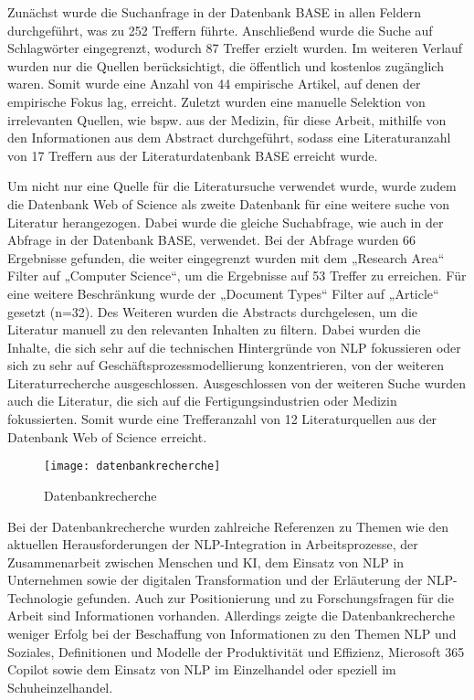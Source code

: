 Zunächst wurde die Suchanfrage in der Datenbank BASE in allen Feldern durchgeführt, was zu 252 Treffern führte. Anschließend wurde die Suche auf Schlagwörter eingegrenzt, wodurch 87 Treffer erzielt wurden. Im weiteren Verlauf wurden nur die Quellen berücksichtigt, die öffentlich und kostenlos zugänglich waren. Somit wurde eine Anzahl von 44 empirische Artikel, auf denen der empirische Fokus lag, erreicht. Zuletzt wurden eine manuelle Selektion von irrelevanten Quellen, wie bspw. aus der Medizin, für diese Arbeit, mithilfe von den Informationen aus dem Abstract durchgeführt, sodass eine Literaturanzahl von 17 Treffern aus der Literaturdatenbank BASE erreicht wurde.

Um nicht nur eine Quelle für die Literatursuche verwendet wurde, wurde zudem die Datenbank Web of Science als zweite Datenbank für eine weitere suche von Literatur herangezogen. Dabei wurde die gleiche Suchabfrage, wie auch in der Abfrage in der Datenbank BASE, verwendet. Bei der Abfrage wurden 66 Ergebnisse gefunden, die weiter eingegrenzt wurden mit dem „Research Area“ Filter auf „Computer Science“, um die Ergebnisse auf 53 Treffer zu erreichen. Für eine weitere Beschränkung wurde der „Document Types“ Filter auf „Article“ gesetzt (n=32). Des Weiteren wurden die Abstracts durchgelesen, um die Literatur manuell zu den relevanten Inhalten zu filtern. Dabei wurden die Inhalte, die sich sehr auf die technischen Hintergründe von NLP fokussieren oder sich zu sehr auf Geschäftsprozessmodellierung konzentrieren, von der weiteren Literaturrecherche ausgeschlossen. Ausgeschlossen von der weiteren Suche wurden auch die Literatur, die sich auf die Fertigungsindustrien oder Medizin fokussierten. Somit wurde eine Trefferanzahl von 12 Literaturquellen aus der Datenbank Web of Science erreicht.

\begin{figure}[H]
    \centering
    \caption{Datenbankrecherche}
    \texttt{[image: datenbankrecherche]}
    \captionsetup{font=scriptsize}
    \label{fig:methodik}
\end{figure}

Bei der Datenbankrecherche wurden zahlreiche Referenzen zu Themen wie den aktuellen Herausforderungen der NLP-Integration in Arbeitsprozesse, der Zusammenarbeit zwischen Menschen und KI, dem Einsatz von NLP in Unternehmen sowie der digitalen Transformation und der Erläuterung der NLP-Technologie gefunden. Auch zur Positionierung und zu Forschungsfragen für die Arbeit sind Informationen vorhanden. Allerdings zeigte die Datenbankrecherche weniger Erfolg bei der Beschaffung von Informationen zu den Themen NLP und Soziales, Definitionen und Modelle der Produktivität und Effizienz, Microsoft 365 Copilot sowie dem Einsatz von NLP im Einzelhandel oder speziell im Schuheinzelhandel.

